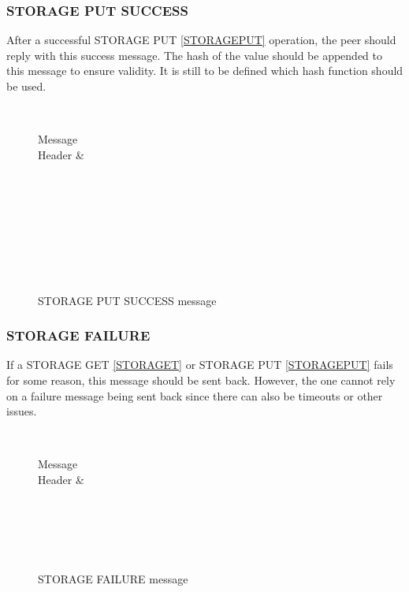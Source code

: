 \documentclass[a4paper, 11pt]{article}
\begin{document}
\subsubsection{STORAGE PUT SUCCESS}

After a successful STORAGE PUT \ref{STORAGEPUT} operation, the peer should reply with this success message. The hash of the value should be appended to this message to ensure validity. It is still to be defined which hash function should be used.

\begin{figure}[H]
	\centering
	\begin{bytefield}[bitwidth=0.8em]{32}
		 \\
		\begin{rightwordgroup}{Message \\  Header}
			 & 
		\end{rightwordgroup} \\
		 \\
		\skippedwords \\
		 \\
		 \\
		\skippedwords \\
		 \\
	\end{bytefield}
	\caption{STORAGE PUT SUCCESS message}
	\label{STORAGEPUTSUCCESS}
\end{figure}

\subsubsection{STORAGE FAILURE}

If a STORAGE GET \ref{STORAGET} or STORAGE PUT \ref{STORAGEPUT} fails for some reason, this message should be sent back. However, the one cannot rely on a failure message being sent back since there can also be timeouts or other issues.

\begin{figure}[H]
	\centering
	\begin{bytefield}[bitwidth=0.8em]{32}
		 \\
		\begin{rightwordgroup}{Message \\  Header}
			 & 
		\end{rightwordgroup} \\
		 \\
		\skippedwords \\
		 \\
	\end{bytefield}
	\caption{STORAGE FAILURE message}
	\label{STORAGEFAILURE}
\end{figure}
\end{document}
